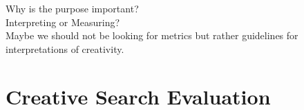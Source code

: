 \begin{fcom}
  Why is the purpose important?\\
  Interpreting or Measuring?\\
  Maybe we should not be looking for metrics but rather guidelines for interpretations of creativity.
\end{fcom}

%
%
%






\section{Creative Search Evaluation}


